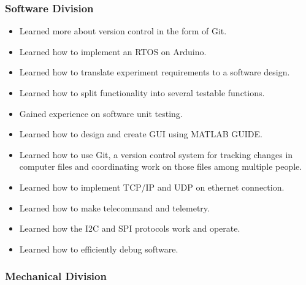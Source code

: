 \subsubsection{Software Division}

\begin{itemize}
    \item Learned more about version control in the form of Git.
    \item Learned how to implement an RTOS on Arduino.
    \item Learned how to translate experiment requirements to a software design.
    \item Learned how to split functionality into several testable functions.
    \item Gained experience on software unit testing.
    \item Learned how to design and create GUI using MATLAB GUIDE.
    \item Learned how to use Git, a version control system for tracking changes in computer files and coordinating work on those files among multiple people.
    \item Learned how to implement TCP/IP and UDP on ethernet connection.
    \item Learned how to make telecommand and telemetry.
    \item Learned how the I2C and SPI protocols work and operate.
    \item Learned how to efficiently debug software. 
\end{itemize}


\subsubsection{Mechanical Division}

